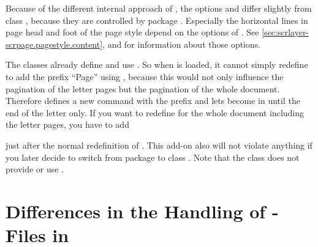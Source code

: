 \begin{Declaration}
\end{Declaration}
Because of the different internal approach of , the options
 and  differ slightly from
class , because they are controlled by package
. Especially the horizontal lines in page head and
foot of the  page style depend on the options of
. See
\autoref{sec:scrlayer-scrpage.pagestyle.content},
 and
 for information
about those options.%
\EndIndexGroup


\begin{Declaration}
\end{Declaration}
The \KOMAScript{} classes already define and use . So when
 is loaded, it cannot simply redefine  to
add the prefix ``Page'' using , because this would not only
influence the pagination of the letter pages but the pagination of the whole
document. Therefore 
defines a new command  with the prefix and lets
 become  in
 until the end of the letter only. If you want
to redefine  for the whole document including the letter
pages, you have to add
\begin{lstcode}
  \let\letterpagemark\pagemark
\end{lstcode}
just after the normal redefinition of . This add-on also will
not violate anything if you later decide to switch from package
 to class . Note that the class
 does not provide or use .%
\EndIndexGroup
%
\EndIndexGroup


\section{Differences in the Handling of -Files in 
  }
\BeginIndexGroup
{}
%
%

